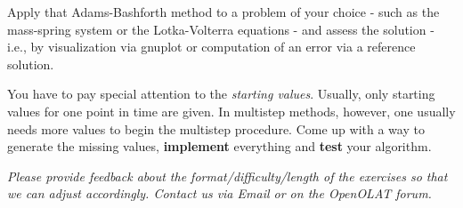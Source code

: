 \documentclass[a4paper]{scrartcl}
\begin{document}
Apply that Adams-Bashforth method to a problem of your choice - such as the mass-spring system or the Lotka-Volterra equations - and assess the solution - i.e., by visualization via gnuplot or computation of an error via a reference solution.

You have to pay special attention to the \emph{starting values}. Usually, only starting values for one point in time are given. In multistep methods, however, one usually needs more values to begin the multistep procedure. Come up with a way to generate the missing values, \textbf{implement} everything and \textbf{test} your algorithm.

\vspace*{0.5cm}
\textit{Please provide feedback about the format/difficulty/length of the exercises so that we can adjust accordingly. Contact us via Email or on the OpenOLAT forum.}
\end{document}
